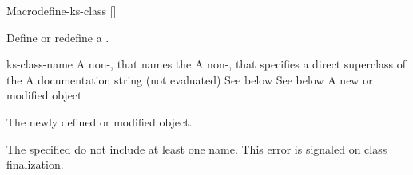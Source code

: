 \documentclass[10pt,twoside,english,pdftex]{article}
\begin{document}

\begin{functiondoc}{Macro}{define-ks-class}%
   { 
     [] \\
     }
%
%
%

\fnsyntax

\fnpurpose Define or redefine a .

\fnpackage {}

\fnmodule {}

\fnargs
\begin{args}{ks-class-name}
 A non-\nil,  that names the
 A non-\nil,  that specifies a
direct superclass of the  
\arg[documentation] A documentation string (not evaluated)
 See below
 See below
 A new or modified  object
\end{args}

\fnreturns The newly defined or modified  object.

\fnerrors The specified  do not include at least
one  name.  This error is signaled on class finalization.


\end{functiondoc}
\end{document}
